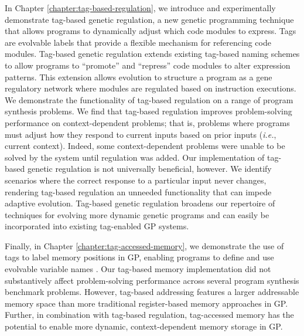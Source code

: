 In Chapter \ref{chapter:tag-based-regulation}, we introduce and experimentally demonstrate tag-based genetic regulation, a new genetic programming technique that allows programs to dynamically adjust which code modules to express.
Tags are evolvable labels that provide a flexible mechanism for referencing code modules. 
Tag-based genetic regulation extends existing tag-based naming schemes to allow programs to ``promote'' and ``repress'' code modules to alter expression patterns.
This extension allows evolution to structure a program as a gene regulatory network where modules are regulated based on instruction executions.
We demonstrate the functionality of tag-based regulation on a range of program synthesis problems. 
We find that tag-based regulation improves problem-solving performance on context-dependent problems; that is, problems where programs must adjust how they respond to current inputs based on prior inputs (\textit{i.e.}, current context).
Indeed, some context-dependent problems were unable to be solved by the system until regulation was added.
Our implementation of tag-based genetic regulation is not universally beneficial, however.
We identify scenarios where the correct response to a particular input never changes, rendering tag-based regulation an unneeded functionality that can impede adaptive evolution.
Tag-based genetic regulation broadens our repertoire of techniques for evolving more dynamic genetic programs and can easily be incorporated into existing tag-enabled GP systems.

Finally, in Chapter \ref{chapter:tag-accessed-memory}, we demonstrate the use of tags to label memory positions in GP, enabling programs to define and use evolvable variable names \citep{lalejini_tag-accessed_2019}.
Our tag-based memory implementation did not substantively affect problem-solving performance across several program synthesis benchmark problems.
However, tag-based addressing features a larger addressable memory space than more traditional register-based memory approaches in GP.
Further, in combination with tag-based regulation, tag-accessed memory has the potential to enable more dynamic, context-dependent memory storage in GP.

 

